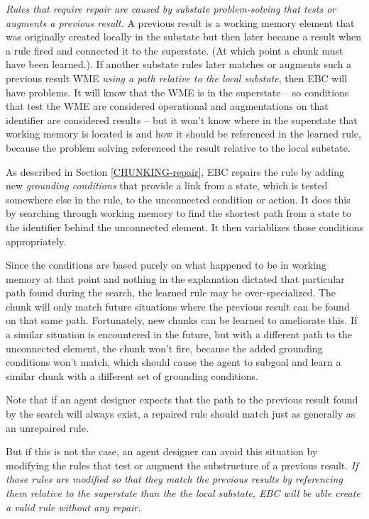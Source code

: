 \textit{Rules that require repair are caused by substate problem-solving that tests or augments a previous result.}  A previous result is a working memory element that was originally created locally in the substate but then later became a result when a rule fired and connected it to the superstate.  (At which point a chunk must have been learned.). If another substate rules later matches or augments such a previous result WME \emph{using a path relative to the local substate}, then EBC will have problems.  It will know that the WME is in the superstate -- so conditions that test the WME are considered operational and augmentations on that identifier are considered results -- but it won't know where in the superstate that working memory is located is and how it should be referenced in the learned rule, because the problem solving referenced the result relative to the local substate.

As described in Section \ref{CHUNKING-repair}, EBC repairs the rule by adding new  \textit{grounding conditions} that provide a link from a state, which is tested somewhere else in the rule, to the unconnected condition or action. It does this by searching through working memory to find the shortest path from a state to the identifier behind the unconnected element.  It then variablizes those conditions appropriately.

Since the conditions are based purely on what happened to be in working memory at that point and nothing in the explanation dictated that particular path found during the search, the learned rule may be over-specialized.  The chunk will only match future situations where the previous result can be found on that same path.  Fortunately, new chunks can be learned to ameliorate this.  If a similar situation is encountered in the future, but with a different path to the unconnected element, the chunk won't fire, because the added grounding conditions won't match, which should cause the agent to subgoal and learn a similar chunk with a different set of grounding conditions.

Note that if an agent designer expects that the path to the previous result found by the search will always exist, a repaired rule should match just as generally as an unrepaired rule.

But if this is not the case, an agent designer can avoid this situation by modifying the rules that test or augment the substructure of a previous result.  \emph{If those rules are modified so that they match the previous results by referencing them relative to the superstate than the the local substate, EBC will be able create a valid rule without any repair.}

